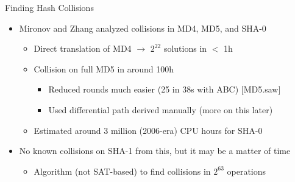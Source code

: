 \documentclass[ignorenonframetext,]{beamer}
\providecommand{\tightlist}{%
  \setlength{\itemsep}{0pt}\setlength{\parskip}{0pt}}
\newcommand{\infile}[1]{{\tiny \alert{[#1]}}}
\begin{document}
\begin{frame}{Finding Hash Collisions}

\begin{itemize}
\tightlist
\item Mironov and Zhang analyzed collisions in MD4, MD5, and SHA-0
  \cite{mironov2006hash}

  \begin{itemize}
  \tightlist
  \item
    Direct translation of MD4 \(\rightarrow\) \(2^{22}\) solutions in
    \(<\) 1h
  \item
    Collision on full MD5 in around 100h

    \begin{itemize}
    \tightlist
    \item
      Reduced rounds much easier (25 in 38s with ABC) \infile{MD5.saw}
    \item
      Used differential path derived manually (more on this later)
    \end{itemize}
  \item
    Estimated around 3 million (2006-era) CPU hours for SHA-0
  \end{itemize}
\item
  No known collisions on SHA-1 from this, but it may be a matter of time

  \begin{itemize}
  \tightlist
  \item
    Algorithm (not SAT-based) to find collisions in \(2^{63}\)
    operations
  \end{itemize}
\end{itemize}

\end{frame}
\end{document}
